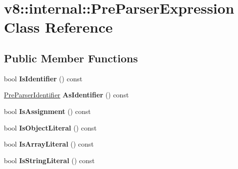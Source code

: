 \hypertarget{classv8_1_1internal_1_1_pre_parser_expression}{}\section{v8\+:\+:internal\+:\+:Pre\+Parser\+Expression Class Reference}
\label{classv8_1_1internal_1_1_pre_parser_expression}
\subsection*{Public Member Functions}
\begin{DoxyCompactItemize}
\item 
bool {\bfseries Is\+Identifier} () const \hypertarget{classv8_1_1internal_1_1_pre_parser_expression_a0c51f840c77b23a1f6539266e52dc3c6}{}\label{classv8_1_1internal_1_1_pre_parser_expression_a0c51f840c77b23a1f6539266e52dc3c6}

\item 
\hyperlink{classv8_1_1internal_1_1_pre_parser_identifier}{Pre\+Parser\+Identifier} {\bfseries As\+Identifier} () const \hypertarget{classv8_1_1internal_1_1_pre_parser_expression_a63b4713763ad9fe4a4c63b190bad3075}{}\label{classv8_1_1internal_1_1_pre_parser_expression_a63b4713763ad9fe4a4c63b190bad3075}

\item 
bool {\bfseries Is\+Assignment} () const \hypertarget{classv8_1_1internal_1_1_pre_parser_expression_ad1403c69696b145b0c24e2bc061c4872}{}\label{classv8_1_1internal_1_1_pre_parser_expression_ad1403c69696b145b0c24e2bc061c4872}

\item 
bool {\bfseries Is\+Object\+Literal} () const \hypertarget{classv8_1_1internal_1_1_pre_parser_expression_aabc74befa7c449162574145b9b12df50}{}\label{classv8_1_1internal_1_1_pre_parser_expression_aabc74befa7c449162574145b9b12df50}

\item 
bool {\bfseries Is\+Array\+Literal} () const \hypertarget{classv8_1_1internal_1_1_pre_parser_expression_a6eba755f43614648f42c16acc2d97f65}{}\label{classv8_1_1internal_1_1_pre_parser_expression_a6eba755f43614648f42c16acc2d97f65}

\item 
bool {\bfseries Is\+String\+Literal} () const \hypertarget{classv8_1_1internal_1_1_pre_parser_expression_af6e232477723ff00c7150706d7a1dbc2}{}\label{classv8_1_1internal_1_1_pre_parser_expression_af6e232477723ff00c7150706d7a1dbc2}


\end{DoxyCompactItemize}
